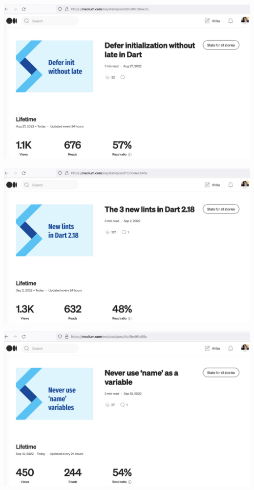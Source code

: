 \begin{center}
    \includegraphics[width=\textwidth]{2022-08-27_defer}
\end{center}

\begin{center}
    \includegraphics[width=\textwidth]{2022-09-02_lints}
\end{center}

\begin{center}
    \includegraphics[width=\textwidth]{2022-09-10_1_name}
\end{center}

